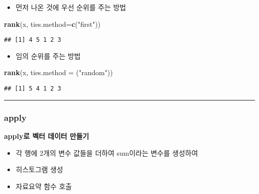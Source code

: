 \documentclass[]{article}
\newenvironment{Shaded}{\begin{snugshade}}{\end{snugshade}}
\newcommand{\KeywordTok}[1]{\textcolor[rgb]{0.13,0.29,0.53}{\textbf{#1}}}
\newcommand{\DataTypeTok}[1]{\textcolor[rgb]{0.13,0.29,0.53}{#1}}
\newcommand{\DecValTok}[1]{\textcolor[rgb]{0.00,0.00,0.81}{#1}}
\newcommand{\StringTok}[1]{\textcolor[rgb]{0.31,0.60,0.02}{#1}}
\newcommand{\CommentTok}[1]{\textcolor[rgb]{0.56,0.35,0.01}{\textit{#1}}}
\newcommand{\NormalTok}[1]{#1}
\providecommand{\tightlist}{%
  \setlength{\itemsep}{0pt}\setlength{\parskip}{0pt}}
\begin{document}
\begin{itemize}
\tightlist
\item
  먼저 나온 것에 우선 순위를 주는 방법
\end{itemize}

\begin{Shaded}
\begin{Highlighting}[]
\KeywordTok{rank}\NormalTok{(x, }\DataTypeTok{ties.method=}\KeywordTok{c}\NormalTok{(}\StringTok{"first"}\NormalTok{))}
\end{Highlighting}
\end{Shaded}

\begin{verbatim}
## [1] 4 5 1 2 3
\end{verbatim}

\begin{itemize}
\tightlist
\item
  임의 순위를 주는 방법
\end{itemize}

\begin{Shaded}
\begin{Highlighting}[]
\KeywordTok{rank}\NormalTok{(x, }\DataTypeTok{ties.method =}\NormalTok{ (}\StringTok{"random"}\NormalTok{))}
\end{Highlighting}
\end{Shaded}

\begin{verbatim}
## [1] 5 4 1 2 3
\end{verbatim}

\begin{center}\rule{0.5\linewidth}{\linethickness}\end{center}

\subsubsection{apply}\label{apply}

\textbf{apply로 벡터 데이터 만들기}

\begin{itemize}
\tightlist
\item
  각 행에 2개의 변수 값들을 더하여 sum이라는 변수를 생성하여
\item
  히스토그램 생성
\item
  자료요약 함수 호출
\end{itemize}

\begin{Shaded}
\end{Shaded}
\end{document}

